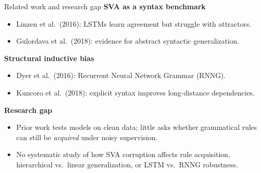 \begin{frame}{Related work and research gap}
  \textbf{SVA as a syntax benchmark}
  \begin{itemize}
    \item Linzen et al.\ (2016): LSTMs learn agreement but struggle with attractors.
    \item Gulordava et al.\ (2018): evidence for abstract syntactic generalization.
  \end{itemize}

  \vspace{0.2cm}
  \textbf{Structural inductive bias}
  \begin{itemize}
    \item Dyer et al.\ (2016): Recurrent Neural Network Grammar (RNNG).
    \item Kuncoro et al.\ (2018): explicit syntax improves long-distance dependencies.
  \end{itemize}

  \vspace{0.2cm}
  \textbf{Research gap}
  \begin{itemize}
    \item Prior work tests models on clean data; little asks whether
          grammatical rules can still be \emph{acquired} under noisy supervision.
    \item No systematic study of how SVA corruption affects rule acquisition,
          hierarchical vs.\ linear generalization, or LSTM vs.\ RNNG robustness.
  \end{itemize}
\end{frame}
